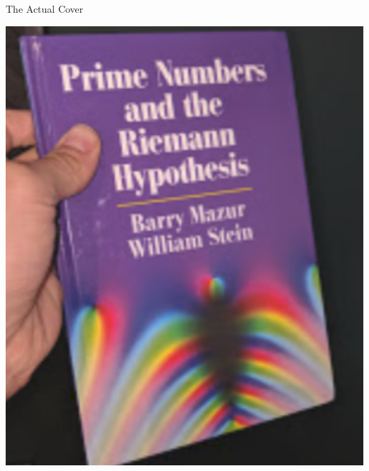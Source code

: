 \documentclass{beamer}
\begin{document}
\begin{frame}{The Actual Cover}
  \begin{center}
    \includegraphics[height=.82\textheight]{pics/cover-front}
  \end{center}
\end{frame}
\end{document}
